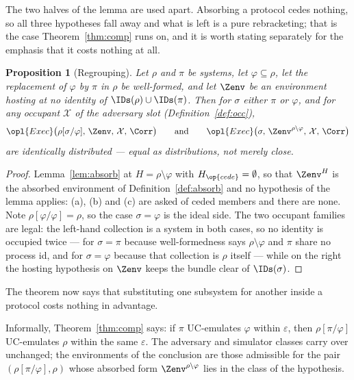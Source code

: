 \documentclass[10pt,oneside,openany]{book}
\theoremstyle{accentdef}
\theoremstyle{accentplain}
\newtheorem{proposition}[definition]{Proposition}
\begin{document}
The two halves of the lemma are used apart. Absorbing a protocol cedes nothing, so all three
hypotheses fall away and what is left is a pure rebracketing; that is the case
Theorem~\ref{thm:comp} runs on, and it is worth stating separately for the emphasis that it costs
nothing at all.

\begin{proposition}[Regrouping]\label{prop:regroup}
Let $\rho$ and $\pi$ be systems, let $\varphi \subseteq \rho$, let the replacement of $\varphi$
by $\pi$ in $\rho$ be well-formed,
and let $\Zenv$ be an environment hosting at no identity of $\IDs(\rho) \cup \IDs(\pi)$. Then for
$\sigma$ either $\pi$ or $\varphi$, and for any occupant $\mathcal{X}$ of the adversary slot
(Definition~\ref{def:occ}),
\[
  \opl{Exec}\bigl(\rho[\sigma/\varphi],\,\Zenv,\,\mathcal{X},\,\Corr\bigr)
  \qquad\text{and}\qquad
  \opl{Exec}\bigl(\sigma,\,\Zenv^{\rho \setminus \varphi},\,\mathcal{X},\,\Corr\bigr)
\]
are identically distributed --- equal as distributions, not merely close.
\end{proposition}

\begin{proof}
Lemma~\ref{lem:absorb} at $H = \rho \setminus \varphi$ with $H_{\op{cede}} = \emptyset$, so that
$\Zenv^{H}$ is the absorbed environment of Definition~\ref{def:absorb} and no hypothesis of the lemma
applies: (a), (b) and (c) are asked of ceded members and there are none. Note
$\rho[\varphi/\varphi] = \rho$, so the case $\sigma = \varphi$ is the ideal side. The two occupant
families are legal: the left-hand collection is a system in both cases, so no identity is occupied
twice --- for $\sigma = \pi$ because well-formedness says $\rho \setminus \varphi$ and $\pi$ share no
process id, and for $\sigma = \varphi$ because that collection is $\rho$ itself --- while on the right
the hosting hypothesis on $\Zenv$ keeps the bundle clear of $\IDs(\sigma)$.
\end{proof}

The theorem now says that substituting one subsystem for another inside a protocol costs
nothing in advantage.

Informally, Theorem~\ref{thm:comp} says: if $\pi$ UC-emulates $\varphi$ within $\varepsilon$,
then $\rho[\pi/\varphi]$ UC-emulates $\rho$ within the same $\varepsilon$. The adversary and
simulator classes carry over unchanged; the environments of the conclusion are those admissible
for the pair $(\rho[\pi/\varphi],\rho)$ whose absorbed form $\Zenv^{\rho \setminus \varphi}$
lies in the class of the hypothesis.
\end{document}

